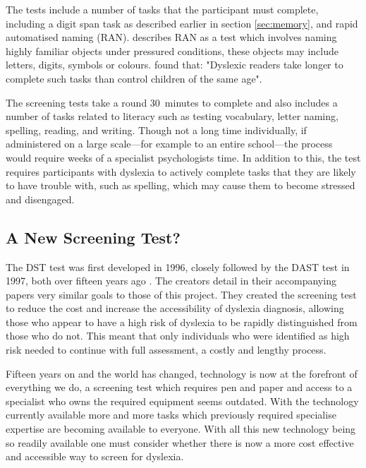 \documentclass[journal]{IEEEtran}
\begin{document}
The tests include a number of tasks that the participant must complete, including a digit span task as described earlier in section \ref{sec:memory}, and rapid automatised naming (RAN). \cite{snowling} describes RAN as a test which involves naming highly familiar objects under pressured conditions, these objects may include letters, digits, symbols or colours. \cite{snowling} found that: "Dyslexic readers take longer to complete such tasks than control children of the same age".
 
The screening tests take a round 30~minutes to complete and also includes a number of tasks related to literacy such as testing vocabulary, letter naming, spelling, reading, and writing\cite{screeningTests}. Though not a long time individually, if administered on a large scale---for example to an entire school---the process would require weeks of a specialist psychologists time. In addition to this, the test requires participants with dyslexia to actively complete tasks that they are likely to have trouble with, such as spelling, which may cause them to become stressed and disengaged. 

\subsection{A New Screening Test?}
The DST test was first developed in 1996, closely followed by the DAST test in 1997, both over fifteen years ago \cite{dastTest, dstTest}. The creators detail in their accompanying papers very similar goals to those of this project. They created the screening test to reduce the cost and increase the accessibility of dyslexia diagnosis, allowing those who appear to have a high risk of dyslexia to be rapidly distinguished from those who do not. This meant that only individuals who were identified as high risk needed to continue with full assessment, a costly and lengthy process.

Fifteen years on and the world has changed, technology is now at the forefront of everything we do, a screening test which requires pen and paper and access to a specialist who owns the required equipment seems outdated. 
With the technology currently available more and more tasks which previously required specialise expertise are becoming available to everyone. With all this new technology being so readily available one must consider whether there is now a more cost effective and accessible way to screen for dyslexia.
\end{document}
